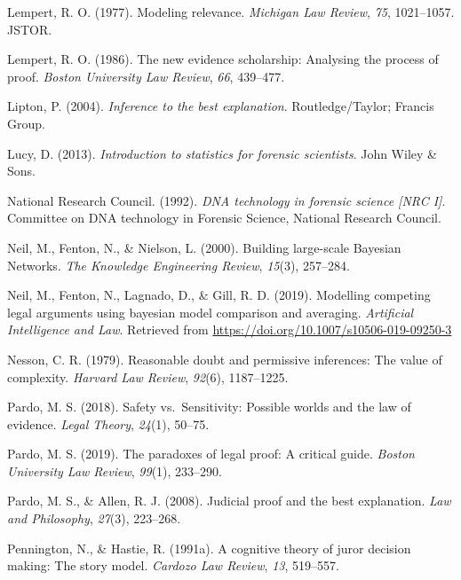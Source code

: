 \documentclass[11pt,dvipsnames,enabledeprecatedfontcommands]{scrartcl}
\begin{document}
\hypertarget{ref-lempert1977modeling}{}
Lempert, R. O. (1977). Modeling relevance. \emph{Michigan Law Review},
\emph{75}, 1021--1057. JSTOR.

\hypertarget{ref-Lempert1986}{}
Lempert, R. O. (1986). The new evidence scholarship: Analysing the
process of proof. \emph{Boston University Law Review}, \emph{66},
439--477.

\hypertarget{ref-Lipton2004-LIPITT}{}
Lipton, P. (2004). \emph{Inference to the best explanation}.
Routledge/Taylor; Francis Group.

\hypertarget{ref-lucy2013introduction}{}
Lucy, D. (2013). \emph{Introduction to statistics for forensic
scientists}. John Wiley \& Sons.

\hypertarget{ref-NRCI1992}{}
National Research Council. (1992). \emph{DNA technology in forensic
science \textup{{[}NRC I{]}}}. Committee on DNA technology in Forensic
Science, National Research Council.

\hypertarget{ref-neil2000BuildingLargescaleBayesian}{}
Neil, M., Fenton, N., \& Nielson, L. (2000). Building large-scale
Bayesian Networks. \emph{The Knowledge Engineering Review},
\emph{15}(3), 257--284.

\hypertarget{ref-Fenton2019Modelling}{}
Neil, M., Fenton, N., Lagnado, D., \& Gill, R. D. (2019). Modelling
competing legal arguments using bayesian model comparison and averaging.
\emph{Artificial Intelligence and Law}. Retrieved from
\url{https://doi.org/10.1007/s10506-019-09250-3}

\hypertarget{ref-Nesson1979Reasonable-doub}{}
Nesson, C. R. (1979). Reasonable doubt and permissive inferences: The
value of complexity. \emph{Harvard Law Review}, \emph{92}(6),
1187--1225.

\hypertarget{ref-pardo2018}{}
Pardo, M. S. (2018). Safety vs.~Sensitivity: Possible worlds and the law
of evidence. \emph{Legal Theory}, \emph{24}(1), 50--75.

\hypertarget{ref-pardo2019}{}
Pardo, M. S. (2019). The paradoxes of legal proof: A critical guide.
\emph{Boston University Law Review}, \emph{99}(1), 233--290.

\hypertarget{ref-Pardo2008judicial}{}
Pardo, M. S., \& Allen, R. J. (2008). Judicial proof and the best
explanation. \emph{Law and Philosophy}, \emph{27}(3), 223--268.

\hypertarget{ref-Pennington1991}{}
Pennington, N., \& Hastie, R. (1991a). A cognitive theory of juror
decision making: The story model. \emph{Cardozo Law Review}, \emph{13},
519--557.
\end{document}
